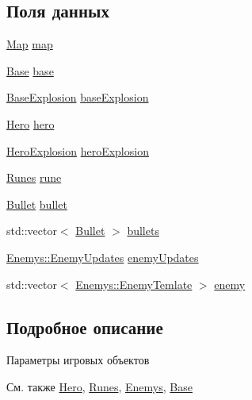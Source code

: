 \subsection*{Поля данных}
\begin{DoxyCompactItemize}
\item 
\hyperlink{classGameObject_1_1Map}{Map} \hyperlink{classGameObject_a49b8b56419192fd29243f4ae9ad8c7f3}{map}
\item 
\hyperlink{classGameObject_1_1Base}{Base} \hyperlink{classGameObject_a0d441ea1c04535a1bcfcf0dacd3e46b6}{base}
\item 
\hyperlink{classGameObject_1_1BaseExplosion}{Base\+Explosion} \hyperlink{classGameObject_a03d9b8baaf2b58f0074fe183f4843379}{base\+Explosion}
\item 
\hyperlink{classGameObject_1_1Hero}{Hero} \hyperlink{classGameObject_a492285ce87e02288a1d532f5c83ff773}{hero}
\item 
\hyperlink{classGameObject_1_1HeroExplosion}{Hero\+Explosion} \hyperlink{classGameObject_a3dd518a4cbc7316edf2a4d43efa3dd52}{hero\+Explosion}
\item 
\hyperlink{classGameObject_1_1Runes}{Runes} \hyperlink{classGameObject_aef75ff75d6d246e532f47f54b6fac398}{rune}
\item 
\hyperlink{classGameObject_1_1Bullet}{Bullet} \hyperlink{classGameObject_abfec990ef1d0b3124c838ee9b6357948}{bullet}
\item 
std\+::vector$<$ \hyperlink{classGameObject_1_1Bullet}{Bullet} $>$ \hyperlink{classGameObject_a6c4f71551f2ab511cca56814f3678a11}{bullets}
\item 
\hyperlink{classGameObject_1_1Enemys_1_1EnemyUpdates}{Enemys\+::\+Enemy\+Updates} \hyperlink{classGameObject_a1be22120f03e9c3332dbd74ecb57d8f5}{enemy\+Updates}
\item 
std\+::vector$<$ \hyperlink{classGameObject_1_1Enemys_1_1EnemyTemlate}{Enemys\+::\+Enemy\+Temlate} $>$ \hyperlink{classGameObject_a9ef32e6a46460a1db1d6005eb8a12cdd}{enemy}
\end{DoxyCompactItemize}


\subsection{Подробное описание}
Параметры игровых объектов 

\begin{DoxySeeAlso}{См. также}
\hyperlink{classGameObject_1_1Hero}{Hero}, \hyperlink{classGameObject_1_1Runes}{Runes}, \hyperlink{classGameObject_1_1Enemys}{Enemys}, \hyperlink{classGameObject_1_1Base}{Base} 
\end{DoxySeeAlso}


